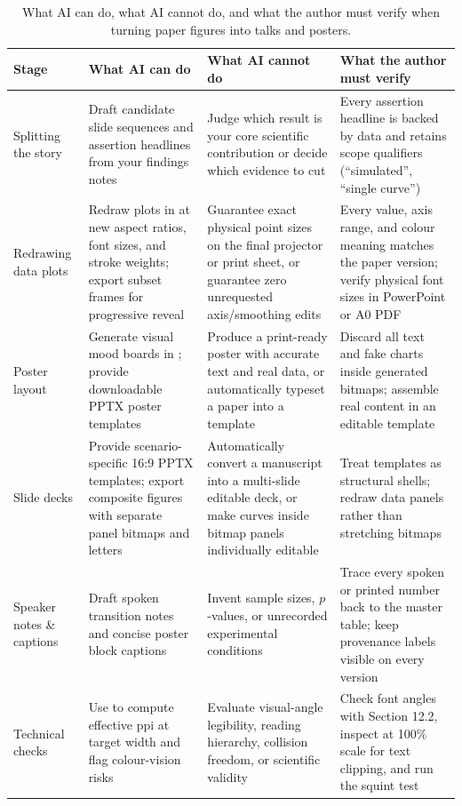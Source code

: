 \begin{table}[htbp]\centering\footnotesize
\setlength{\tabcolsep}{3pt}
\renewcommand{\arraystretch}{1.15}
\caption{What AI can do, what AI cannot do, and what the author must verify when turning paper figures into talks and posters.}\label{tab:ch12-01}
\begin{tabularx}{\linewidth}{@{}>{\raggedright\arraybackslash}p{20mm}YYY@{}}
\toprule
\textbf{Stage} & \textbf{What AI can do} & \textbf{What AI cannot do} & \textbf{What the author must verify} \\
\midrule
Splitting the story & Draft candidate slide sequences and assertion headlines from your findings notes & Judge which result is your core scientific contribution or decide which evidence to cut & Every assertion headline is backed by data and retains scope qualifiers (``simulated'', ``single curve'') \\
Redrawing data plots & Redraw plots in  at new aspect ratios, font sizes, and stroke weights; export subset frames for progressive reveal & Guarantee exact physical point sizes on the final projector or print sheet, or guarantee zero unrequested axis/smoothing edits & Every value, axis range, and colour meaning matches the paper version; verify physical font sizes in PowerPoint or A0 PDF \\
Poster layout & Generate visual mood boards in ; provide downloadable PPTX poster templates & Produce a print-ready poster with accurate text and real data, or automatically typeset a paper into a template & Discard all text and fake charts inside generated bitmaps; assemble real content in an editable template \\
Slide decks & Provide scenario-specific 16:9 PPTX templates; export composite figures with separate panel bitmaps and letters & Automatically convert a manuscript into a multi-slide editable deck, or make curves inside bitmap panels individually editable & Treat templates as structural shells; redraw data panels rather than stretching bitmaps \\
Speaker notes \& captions & Draft spoken transition notes and concise poster block captions & Invent sample sizes, $p$-values, or unrecorded experimental conditions & Trace every spoken or printed number back to the master table; keep provenance labels visible on every version \\
Technical checks & Use  to compute effective ppi at target width and flag colour-vision risks & Evaluate visual-angle legibility, reading hierarchy, collision freedom, or scientific validity & Check font angles with Section 12.2, inspect at 100\% scale for text clipping, and run the squint test \\
\bottomrule
\end{tabularx}
\end{table}

